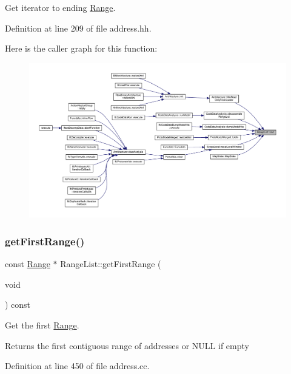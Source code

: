 Get iterator to ending \mbox{\hyperlink{class_range}{Range}}. 



Definition at line 209 of file address.\+hh.

Here is the caller graph for this function\+:
\nopagebreak
\begin{figure}[H]
\begin{center}
\leavevmode
\includegraphics[width=350pt]{class_range_list_aae742ac5298a0d263210366e7aa0bb0b_icgraph}
\end{center}
\end{figure}
\mbox{\label{class_range_list_aab11ea47a228e2689d18061df238dc6f}} 
\subsubsection{\texorpdfstring{getFirstRange()}{getFirstRange()}}
{\footnotesize\ttfamily const \mbox{\hyperlink{class_range}{Range}} $\ast$ Range\+List\+::get\+First\+Range (\begin{DoxyParamCaption}\item[{void}]{ }\end{DoxyParamCaption}) const}



Get the first \mbox{\hyperlink{class_range}{Range}}. 

\begin{DoxyReturn}{Returns}
the first contiguous range of addresses or N\+U\+LL if empty 
\end{DoxyReturn}


Definition at line 450 of file address.\+cc.

